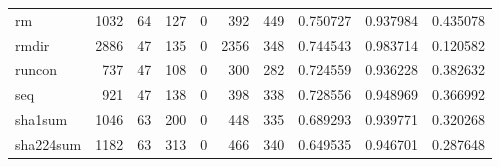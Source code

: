 \begin{tabular}{lrrrrrrrrr}
rm        &                                               1032 &                                                 64 &                                                127 &                                                  0 &                                                392 &                                                449 &                                           0.750727 &                               0.937984 &                             0.435078 \\
rmdir     &                                               2886 &                                                 47 &                                                135 &                                                  0 &                                               2356 &                                                348 &                                           0.744543 &                               0.983714 &                             0.120582 \\
runcon    &                                                737 &                                                 47 &                                                108 &                                                  0 &                                                300 &                                                282 &                                           0.724559 &                               0.936228 &                             0.382632 \\
seq       &                                                921 &                                                 47 &                                                138 &                                                  0 &                                                398 &                                                338 &                                           0.728556 &                               0.948969 &                             0.366992 \\
sha1sum   &                                               1046 &                                                 63 &                                                200 &                                                  0 &                                                448 &                                                335 &                                           0.689293 &                               0.939771 &                             0.320268 \\
sha224sum &                                               1182 &                                                 63 &                                                313 &                                                  0 &                                                466 &                                                340 &                                           0.649535 &                               0.946701 &                             0.287648 \\

\end{tabular}
